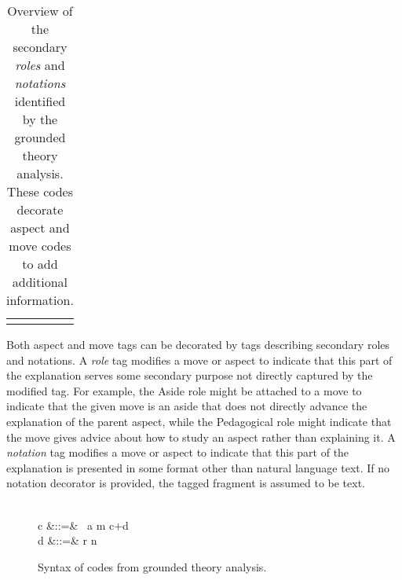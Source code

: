\documentclass[sigconf]{acmart}
\newcommand{\OR}{\OB{\hspace{1.5ex}|\hspace{1.5ex}}}
\newcommand{\Push}{\OB{\Rightarrow}}
\newcommand{\Pop}{\OB{\Leftarrow}}
\begin{document}
\begin{table}
\begin{tabular}{ll}

\\[-1.5ex]

\\[-1.5ex]
\end{tabular}
\caption{Overview of the secondary \emph{roles} and \emph{notations} identified
by the grounded theory analysis. These codes decorate aspect and move codes to
add additional information.}
\label{tbl:codes:dec}
\end{table}


Both aspect and move tags can be decorated by tags describing secondary roles
and notations.
%
A \emph{role} tag modifies a move or aspect to indicate that this part of the
explanation serves some secondary purpose not directly captured by the modified
tag. For example, the Aside role might be attached to a move to indicate that
the given move is an aside that does not directly advance the explanation of
the parent aspect, while the Pedagogical role might indicate that the move
gives advice about how to study an aspect rather than explaining it.
%
A \emph{notation} tag modifies a move or aspect to indicate that this part of
the explanation is presented in some format other than natural language text.
If no notation decorator is provided, the tagged fragment is assumed to be
text.


\begin{figure}
\begin{syntax}
 \\
c\in{}
 &::=& \Push~a
 \OR \!\Pop\!
 \OR m
 \OR c+d \\
d\in{}
 &::=& r \OR n
\end{syntax}

\vspace{-1.5ex}
\caption{Syntax of codes from grounded theory analysis.}
\label{fig:codes:syntax}
\end{figure}
\end{document}
